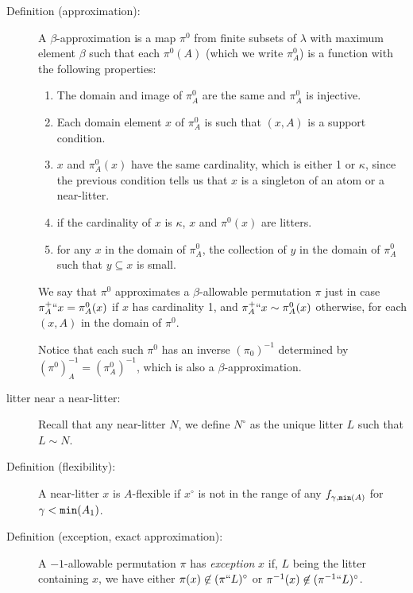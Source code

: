 \documentclass[112pt]{article}
\begin{document}
\begin{description}

\item[Definition (approximation):]   A $\beta$-approximation is a map $\pi^0$ from finite subsets of $\lambda$ with maximum element $\beta$ such
that each $\pi^0(A)$ (which we write $\pi^0_A$) is a function with the following properties:

\begin{enumerate}

\item  The domain and image of $\pi^0_A$ are the same and $\pi^0_A$ is injective.

\item Each domain element $x$ of $\pi^0_A$ is such that $(x,A)$ is a support condition.

\item $x$ and $\pi^0_A(x)$ have the same cardinality, which is either 1 or $\kappa$, since the previous condition tells us that $x$ is a singleton of an  atom or a near-litter.

\item if the cardinality of $x$ is $\kappa$, $x$ and $\pi^0(x)$ are litters.

\item  for any $x$ in the domain of $\pi^0_A$, the collection of $y$ in the domain of $\pi^0_A$ such that $y \subseteq x$ is small.



\end{enumerate}

We say that $\pi^0$ approximates a $\beta$-allowable permutation $\pi$ just in case $\pi^+_A``x = \pi^0_A(x)$ if
$x$ has cardinality 1, and $\pi^+_A``x \sim \pi^0_A(x)$ otherwise, for each $(x,A)$ in the domain of $\pi^0$.

Notice that each such $\pi^0$ has an inverse $(\pi_0)^{-1}$ determined by $(\pi^0)^{-1}_A = (\pi^0_A)^{-1}$, which is also a $\beta$-approximation.

\item[litter near a near-litter:]  Recall that any near-litter $N$, we define $N^\circ$ as the unique litter $L$ such that $L \sim N$.

\item[Definition (flexibility):]  A near-litter $x$ is $A$-flexible if $x^\circ$ is not in the range of any $f_{\gamma,{\tt min}(A)}$
for $\gamma<{\tt min}(A_1)$.



\item[Definition (exception, exact approximation):]  A $-1$-allowable permutation $\pi$ has {\em exception\/} $x$ if, $L$ being the litter containing $x$,
we have either $\pi(x) \not\in (\pi``L)^\circ$ or $\pi^{-1}(x) \not\in (\pi^{-1}``L)^\circ$.


\end{description}
\end{document}
